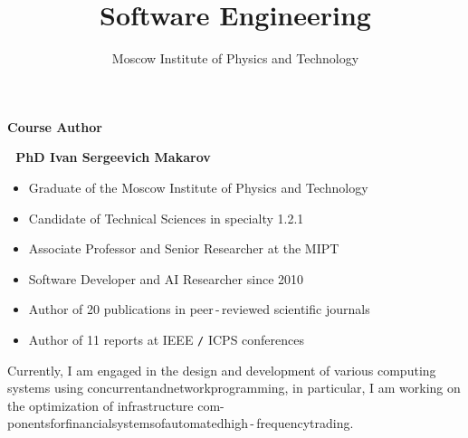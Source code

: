 \documentclass{beamer}
\begin{document}
\title{\bf Software Engineering} 

\author{Moscow Institute of Physics and Technology}

\date{}

\frame{\titlepage}



\begin{frame}{\bf Course Author}

    \textbf{\;\;\;\;\,\,\,\,PhD Ivan Sergeevich Makarov}

    \bigskip
    
    \begin{itemize}

        \item Graduate of the Moscow Institute of Physics and Technology

        \item Candidate of Technical Sciences in specialty 1.2.1

        \item Associate Professor and Senior Researcher at the MIPT

        \item Software Developer and AI Researcher since 2010

        \item Author of 20 publications in peer\,-\,reviewed scientific journals
    
        \item Author of 11 reports at IEEE \texttt{/} ICPS conferences
        
    \end{itemize}

    \begin{block}
    \justifying Currently, I am engaged in the design and development of various computing systems using concurrent\:and\:network\:programming, in particular, I am working on the optimization of infrastructure com- ponents\;for\;financial\;systems\;of\;automated\;high\,-\,frequency\;trading.
    \end{block}
    
\end{frame}
\end{document}

